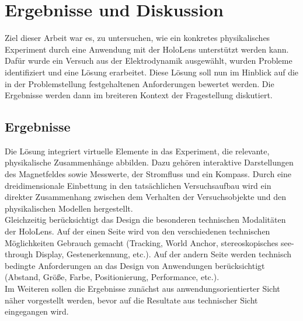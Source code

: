 \section{Ergebnisse und Diskussion}
\label{sec-6}

Ziel dieser Arbeit war es, zu untersuchen, wie ein konkretes physikalisches Experiment durch eine Anwendung mit der HoloLens unterstützt werden kann. Dafür wurde ein Versuch aus der Elektrodynamik ausgewählt, wurden Probleme identifiziert und eine Lösung erarbeitet. Diese Lösung soll nun im Hinblick auf die in der Problemstellung festgehaltenen Anforderungen bewertet werden. Die Ergebnisse werden dann im breiteren Kontext der Fragestellung diskutiert.

\subsection{Ergebnisse}
Die Lösung integriert virtuelle Elemente in das Experiment, die relevante, physikalische Zusammenhänge abbilden. Dazu gehören interaktive Darstellungen des Magnetfeldes sowie Messwerte, der Stromfluss und ein Kompass. Durch eine dreidimensionale Einbettung in den tatsächlichen Versuchsaufbau wird ein direkter Zusammenhang zwischen dem Verhalten der Versuchsobjekte und den physikalischen Modellen hergestellt.\\
\noindent\hspace*{5mm}
Gleichzeitig berücksichtigt das Design die besonderen technischen Modalitäten der HoloLens. Auf der einen Seite wird von den verschiedenen technischen Möglichkeiten Gebrauch gemacht (Tracking, World Anchor, stereoskopisches see-through Display, Gestenerkennung, etc.). Auf der andern Seite werden technisch bedingte Anforderungen an das Design von Anwendungen berücksichtigt (Abstand, Größe, Farbe, Positionierung, Performance, etc.).\\
\noindent\hspace*{5mm}
Im Weiteren sollen die Ergebnisse zunächst aus anwendungsorientierter Sicht näher vorgestellt werden, bevor auf die Resultate aus technischer Sicht eingegangen wird.
 
